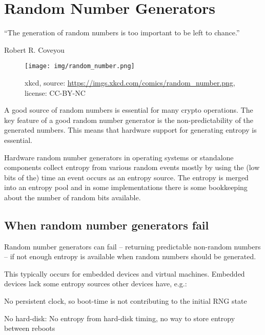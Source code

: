 \section{Random Number Generators}
\label{section:RNGs}


\epigraph{``The generation of random numbers is too important to be left to chance.''}{Robert R. Coveyou}


\begin{figure}[h]
  \centering
  \texttt{[image: img/random\_number.png]}
  \caption{xkcd, source: \url{https://imgs.xkcd.com/comics/random_number.png}, license: CC-BY-NC}
  \label{fig:dilbertRNG}
\end{figure}



A good source of random numbers is essential for many crypto
operations. The key feature of a good random number generator is the
non-predictability of the generated numbers. This means that hardware
support for generating entropy is essential.


Hardware random number generators in operating systems or standalone
components collect entropy from various random events mostly by using
the (low bits of the) time an event occurs as an entropy source. The
entropy is merged into an entropy pool and in some implementations there
is some bookkeeping about the number of random bits available.

\subsection{When random number generators fail}

Random number generators can fail -- returning predictable non-random
numbers -- if not enough entropy is available when random numbers should
be generated.

This typically occurs for embedded devices and virtual machines.
Embedded devices lack some entropy sources other devices have, e.g.:

\begin{itemize*}
  \item No persistent clock, so boot-time is not contributing to the
    initial RNG state
  \item No hard-disk: No entropy from hard-disk timing, no way to store
    entropy between reboots
\end{itemize*}

